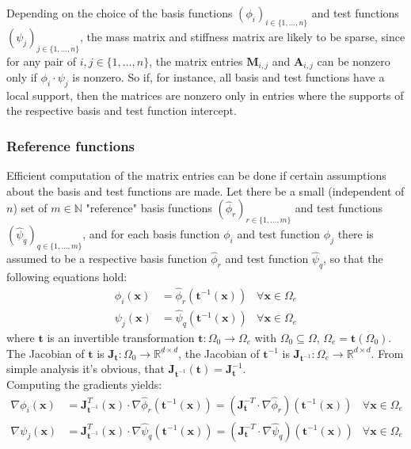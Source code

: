 \documentclass{IOS-Book-Article}
\theoremstyle{plain}
\theoremstyle{definition}
\begin{document}
Depending on the choice of the basis functions $(\phi_i)_{i \in \{1, \dots , n\}}$ and test functions $(\psi_j)_{j \in \{1, \dots , n\}}$, the mass matrix and stiffness matrix are likely to be sparse, since for any pair of $i, j \in \{1, \dots , n\}$, the matrix entries $\mathbf M_{i, j}$ and $\mathbf A_ {i, j}$ can be nonzero only if $\phi_i \cdot \psi_j$ is nonzero. So if, for instance, all basis and test functions have a local support, then  the matrices are nonzero only in entries where the supports of the respective basis and test function intercept.\\

\subsubsection{Reference functions}

Efficient computation of the matrix entries can be done if certain assumptions about the basis and test functions are made. Let there be a small (independent of $n$) set of $m \in \mathbb{N}$ "reference" basis functions $(\hat \phi_r)_{r \in \{1, \dots , m\}}$ and test functions $(\hat \psi_q)_{q \in \{1, \dots , m\}}$, and for each basis function $\phi_i$ and test function $\phi_j$ there is assumed to be a respective basis function $\hat \phi_r$ and test function $\hat \psi_q$, so that the following equations hold:
\begin{align}
	\phi_i(\mathbf x) &= \hat \phi_r(\mathbf t^{-1} (\mathbf x)) & \forall \mathbf x \in \Omega_e \\
	\psi_j(\mathbf x) &= \hat \psi_q(\mathbf t^{-1} (\mathbf x)) & \forall \mathbf x \in \Omega_e
\end{align}
where $\mathbf{t}$ is an invertible transformation $\mathbf{t}: \Omega_0 \rightarrow \Omega_e$ with $\Omega_0 \subseteq \Omega$, $\Omega_e = \mathbf{t}(\Omega_0)$. The Jacobian of $\mathbf t$ is $\mathbf J_{\mathbf t}: \Omega_0 \rightarrow \mathbb{R}^{d \times d}$, the Jacobian of $\mathbf t^{-1}$ is $\mathbf J_{\mathbf t^{-1}}: \Omega_e \rightarrow \mathbb{R}^{d \times d}$. From simple analysis it's obvious, that $\mathbf J_{\mathbf t^{-1}} (\mathbf t) = \mathbf J^{-1}_{\mathbf t}$.\\
Computing the gradients yields:
\begin{align*}
	\nabla \phi_i(\mathbf x) &= \mathbf J_{\mathbf t^{-1}}^T(\mathbf x) \cdot \nabla \hat \phi_r(\mathbf t^{-1} (\mathbf x)) = (\mathbf J_{\mathbf t}^{-T} \cdot \nabla \hat \phi_r)(\mathbf t^{-1} (\mathbf x)) & \forall \mathbf x \in \Omega_e \\
	\nabla \psi_j(\mathbf x) &= \mathbf J_{\mathbf t^{-1}}^T(\mathbf x) \cdot \nabla \hat \psi_q(\mathbf t^{-1} (\mathbf x)) = (\mathbf J_{\mathbf t}^{-T} \cdot \nabla \hat \psi_q)(\mathbf t^{-1} (\mathbf x)) & \forall \mathbf x \in \Omega_e
\end{align*}
\end{document}
